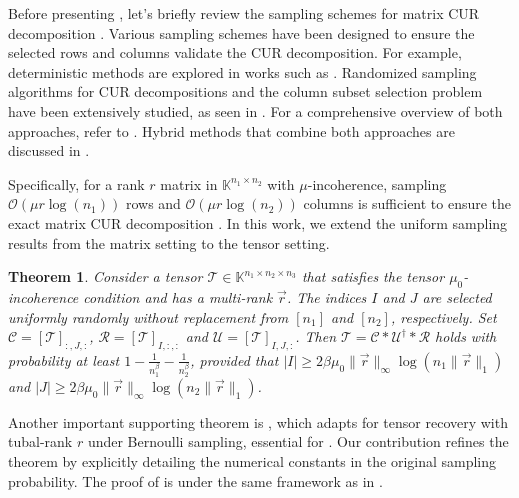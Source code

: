 \documentclass[twoside,12pt]{article}
\newtheorem{theorem}{Theorem}
\def\X{\mathcal{T}}
\def\mcR{\mathcal{R}}
\def\mcC{\mathcal{C}}
\def\cO{\mathcal{O}}
\def\X{\mathcal{T}}
\def\mcR{\mathcal{R}}
\def\mcC{\mathcal{C}}
\def\cO{\mathcal{O}}
\begin{document}
Before presenting , let's briefly review the sampling schemes for matrix CUR decomposition \citep{HammHuang2020}. Various sampling schemes have been designed to ensure the selected rows and columns validate the CUR decomposition. For example, deterministic methods are explored in works such as \citep{AB2013,AltschulerGreedyCSSP,LiDeterministicCSSP}.  
Randomized sampling algorithms for CUR decompositions and the column subset selection problem have been extensively studied, as seen in \citep{chiu2013sublinear,%
DMM08,DMPNAS,tropp2009column,WZ_2013}.  For a comprehensive overview of both approaches, refer to \citep{hamm2020stability}.  Hybrid methods that combine both approaches are discussed in \citep{%
BoutsidisOptimalCUR,cai2021robust}. 

Specifically, for a rank $r$ matrix in  $\mathbb{K}^{n_1\times n_2}$ with $\mu$-incoherence,  sampling $\cO(\mu r\log(n_1))$ rows and $\cO(\mu r\log(n_2))$ columns is sufficient to ensure the exact matrix CUR decomposition \citep{cai2019accelerated%
}. In this work, we extend the uniform sampling results from the matrix setting to the tensor setting. 
\begin{theorem}\label{thm:main-tCUR}\rm
Consider a tensor $\mathcal{T} \in \mathbb{K}^{n_1 \times n_2 \times n_3}$ that  satisfies the tensor $\mu_0$-incoherence condition and has a multi-rank $\vec{r}$.   The indices $I$ and $J$ are selected uniformly randomly without replacement from $[n_1]$ and $[n_2]$,  respectively.  
Set $\mcC=[\X]_{:,J,:}$, $\mcR=[\X]_{I,:,:}$ and $\mathcal{U}=[\X]_{I,J,:}$.  Then $\mathcal{T}=\mcC*\mathcal{U}^\dagger*\mcR$ holds
 with   probability  at least $1-\frac{1}{n_{1}^{\beta}}-\frac{1}{n_{2}^{\beta}}$, provided that $|I|\geq 2\beta \mu_0 \|\vec{r}\|_{\infty} \log \left(n_1\|\vec{r}\|_{1}\right)$ and  $|J|\geq 2\beta \mu_0 \|\vec{r}\|_{\infty} \log \left(n_2\|\vec{r}\|_{1}\right)$. 
\end{theorem}
Another important supporting theorem is  , which adapts \citep[Theorem~3.1]{zhang2017exact} for tensor recovery with tubal-rank \( r \) under Bernoulli sampling, essential for  . Our contribution refines the theorem by explicitly detailing the numerical constants in the original sampling probability. The proof of  is under the same framework as in \citep{%
zhang2017exact}.
\end{document}

